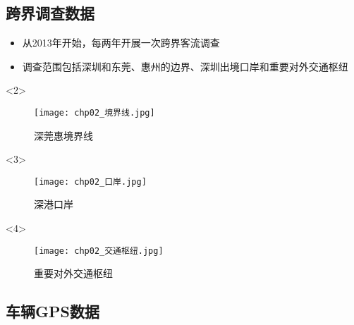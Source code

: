 \subsection{跨界调查数据}

\begin{frame}[t]{\subsecname}
\begin{itemize}
\item 从2013年开始，每两年开展一次跨界客流调查
\item 调查范围包括深圳和东莞、惠州的边界、深圳出境口岸和重要对外交通枢纽
\end{itemize}

\begin{overlayarea}{\textwidth}{\textheight}
  \begin{onlyenv}<2>
\begin{figure}
  \centering
  \texttt{[image: chp02\_境界线.jpg]}
  \caption{深莞惠境界线}
\end{figure}
  \end{onlyenv}

  \begin{onlyenv}<3>
\begin{figure}
  \centering
  \texttt{[image: chp02\_口岸.jpg]}
  \caption{深港口岸}
\end{figure}
  \end{onlyenv}

  \begin{onlyenv}<4>
\begin{figure}
  \centering
  \texttt{[image: chp02\_交通枢纽.jpg]}
  \caption{重要对外交通枢纽}
\end{figure}
  \end{onlyenv}
\end{overlayarea}
\end{frame}

\subsection{车辆GPS数据}

